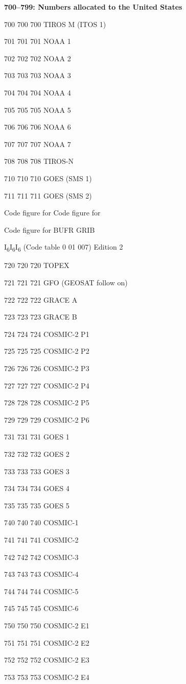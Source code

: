 \textbf{700--799: Numbers allocated to the United States}

700 700 700 TIROS M (ITOS 1)

701 701 701 NOAA 1

702 702 702 NOAA 2

703 703 703 NOAA 3

704 704 704 NOAA 4

705 705 705 NOAA 5

706 706 706 NOAA 6

707 707 707 NOAA 7

708 708 708 TIROS-N

710 710 710 GOES (SMS 1)

711 711 711 GOES (SMS 2)

Code figure for Code figure for

Code figure for BUFR GRIB

I\textsubscript{6}I\textsubscript{6}I\textsubscript{6} (Code table 0 01 007) Edition 2

720 720 720 TOPEX

721 721 721 GFO (GEOSAT follow on)

722 722 722 GRACE A

723 723 723 GRACE B

724 724 724 COSMIC-2 P1

725 725 725 COSMIC-2 P2

726 726 726 COSMIC-2 P3

727 727 727 COSMIC-2 P4

728 728 728 COSMIC-2 P5

729 729 729 COSMIC-2 P6

731 731 731 GOES 1

732 732 732 GOES 2

733 733 733 GOES 3

734 734 734 GOES 4

735 735 735 GOES 5

740 740 740 COSMIC-1

741 741 741 COSMIC-2

742 742 742 COSMIC-3

743 743 743 COSMIC-4

744 744 744 COSMIC-5

745 745 745 COSMIC-6

750 750 750 COSMIC-2 E1

751 751 751 COSMIC-2 E2

752 752 752 COSMIC-2 E3

753 753 753 COSMIC-2 E4

